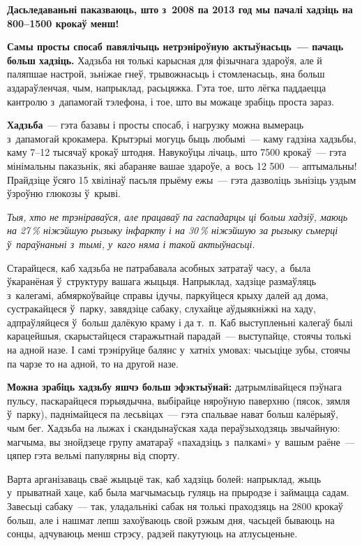 \textbf{Дасьледаваньні паказваюць, што з~2008 па 2013 год мы пачалі хадзіць на 800--1500 крокаў менш!}

\textbf{Самы просты спосаб павялічыць нетрэніроўную актыўнасьць~--- пачаць больш хадзіць.} Хадзьба ня толькі карысная для фізычнага здароўя, але й паляпшае настрой, зьніжае гнеў, трывожнасьць і стомленасьць, яна больш аздараўленчая, чым, напрыклад, расьцяжка. Гэта тое, што лёгка паддаецца кантролю з~дапамогай тэлефона, і тое, што вы можаце зрабіць проста зараз.

\textbf{Хадзьба}~--- гэта базавы і просты спосаб, і нагрузку можна вымераць з~дапамогай крокамера. Крытэрыі могуць быць любымі~--- каму гадзіна хадзьбы, каму 7--12 тысячаў крокаў штодня. Навукоўцы лічаць, што 7500 крокаў~--- гэта мінімальны паказьнік, які абараняе вашае здароўе, а~вось 12 500~--- аптымальны! Прайдзіце ўсяго 15 хвілінаў пасьля прыёму ежы~--- гэта дазволіць зьнізіць уздым ўзроўню глюкозы ў~крыві. 

\emph{Тыя, хто не трэніраваўся, але працаваў па гаспадарцы ці больш хадзіў, маюць на 27\,\% ніжэйшую рызыку інфаркту і на 30\,\% ніжэйшую за рызыку сьмерці ў~параўнаньні з~тымі, у~каго няма і такой актыўнасьці.}

Старайцеся, каб хадзьба не патрабавала асобных затратаў часу, а~была ўкаранёная ў~структуру вашага жыцьця. Напрыклад, хадзіце размаўляць з~калегамі, абмяркоўвайце справы ідучы, паркуйцеся крыху далей ад дома, сустракайцеся ў~парку, завядзіце сабаку, слухайце аўдыякніжкі на хаду, адпраўляйцеся ў~больш далёкую краму і да т.~п. Каб выступленьні калегаў былі карацейшыя, скарыстайцеся старажытнай парадай~--- выступайце, стоячы толькі на адной назе. І самі трэніруйце балянс у~хатніх умовах: чысьціце зубы, стоячы па чарзе то на адной, то на другой назе.

\textbf{Можна зрабіць хадзьбу яшчэ больш эфэктыўнай:} датрымлівайцеся пэўнага пульсу, паскарайцеся пэрыядычна, выбірайце няроўную паверхню (пясок, зямля ў~парку), паднімайцеся па лесьвіцах~--- гэта спальвае нават больш калёрыяў, чым бег. Хадзьба на лыжах і скандынаўская хада пераўзыходзяць звычайную: магчыма, вы знойдзеце групу аматараў «пахадзіць з~палкамі» у~вашым раёне~--- цяпер гэта вельмі папулярны від спорту.

Варта арганізаваць сваё жыцьцё так, каб хадзіць болей: напрыклад, жыць у~прыватнай хаце, каб была магчымасьць гуляць на прыродзе і займацца садам. Завесьці сабаку~--- так, уладальнікі сабак ня толькі праходзяць на 2800 крокаў больш, але і нашмат лепш захоўваюць свой рэжым дня, часьцей бываюць на сонцы, адчуваюць менш стрэсу, радзей пакутуюць на атлусьценьне.

